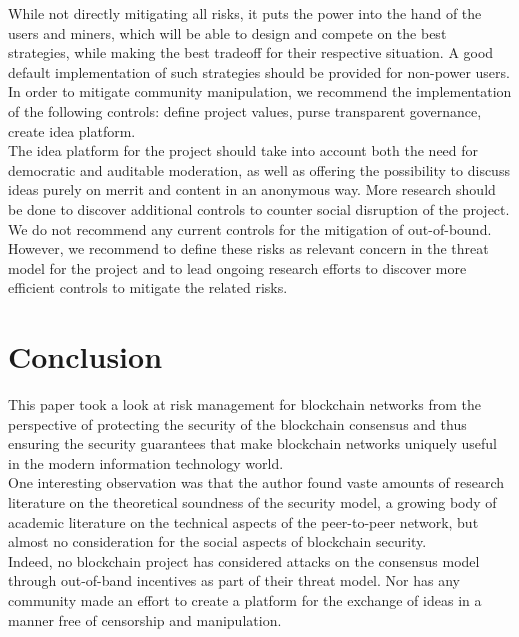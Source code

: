 \documentclass[12pt,a4paper]{article}
\begin{document}
While not directly mitigating all risks, it puts the power into the hand of the users and miners, which will be able to design and compete on the best strategies, while making the best tradeoff for their respective situation. A good default implementation of such strategies should be provided for non-power users.\\

In order to mitigate community manipulation, we recommend the implementation of the following controls: define project values, purse transparent governance, create idea platform.\\

The idea platform for the project should take into account both the need for democratic and auditable moderation, as well as offering the possibility to discuss ideas purely on merrit and content in an anonymous way. More research should be done to discover additional controls to counter social disruption of the project.\\

We do not recommend any current controls for the mitigation of out-of-bound. However, we recommend to define these risks as relevant concern in the threat model for the project and to lead ongoing research efforts to discover more efficient controls to mitigate the related risks.\\

\section{Conclusion}

This paper took a look at risk management for blockchain networks from the perspective of protecting the security of the blockchain consensus and thus ensuring the security guarantees that make blockchain networks uniquely useful in the modern information technology world.\\

One interesting observation was that the author found vaste amounts of research literature on the theoretical soundness of the security model, a growing body of academic literature on the technical aspects of the peer-to-peer network, but almost no consideration for the social aspects of blockchain security.\\

Indeed, no blockchain project has considered attacks on the consensus model through out-of-band incentives as part of their threat model. Nor has any community made an effort to create a platform for the exchange of ideas in a manner free of censorship and manipulation.\\
\end{document}
